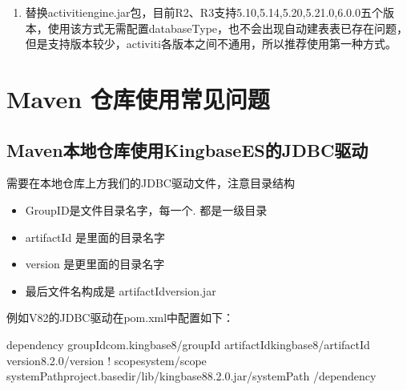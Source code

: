 \documentclass[letterpaper,10pt,english]{sphinxmanual}
\begin{document}
\begin{sphinxVerbatim}[commandchars=\\\{\}]
\end{sphinxVerbatim}
\begin{enumerate}
%
\setcounter{enumi}{1}
\item {} 
替换activiti\sphinxhyphen{}engine.jar包，目前R2、R3支持5.10,5.14,5.20,5.21.0,6.0.0五个版本，使用该方式无需配置databaseType，也不会出现自动建表表已存在问题，但是支持版本较少，activiti各版本之间不通用，所以推荐使用第一种方式。

\end{enumerate}


\section{Maven 仓库使用常见问题}
\label{\detokenize{interface/maven:maven}}\label{\detokenize{interface/maven::doc}}

\subsection{Maven本地仓库使用KingbaseES的JDBC驱动}
\label{\detokenize{interface/maven:mavenkingbaseesjdbc}}
需要在本地仓库上方我们的JDBC驱动文件，注意目录结构
\begin{itemize}
\item {} 
GroupID是文件目录名字，每一个. 都是一级目录

\item {} 
artifactId 是里面的目录名字

\item {} 
version 是更里面的目录名字

\item {} 
最后文件名构成是  artifactId\sphinxhyphen{}version.jar

\end{itemize}

例如V82的JDBC驱动在pom.xml中配置如下：

\begin{sphinxVerbatim}[commandchars=\\\{\}]
\PYGZlt{}dependency\PYGZgt{}
      \PYGZlt{}groupId\PYGZgt{}com.kingbase8\PYGZlt{}/groupId\PYGZgt{}
      \PYGZlt{}artifactId\PYGZgt{}kingbase8\PYGZlt{}/artifactId\PYGZgt{}
      \PYGZlt{}version\PYGZgt{}8.2.0\PYGZlt{}/version\PYGZgt{}
      \PYGZlt{}!\PYGZhy{}\PYGZhy{} scope\PYGZgt{}system\PYGZlt{}/scope\PYGZgt{}
   \PYGZlt{}systemPath\PYGZgt{}\PYGZdl{}\PYGZob{}project.basedir\PYGZcb{}/lib/kingbase8\PYGZhy{}8.2.0.jar\PYGZlt{}/systemPath\PYGZhy{}\PYGZhy{}\PYGZgt{}
   \PYGZlt{}/dependency\PYGZgt{}
\end{sphinxVerbatim}
\end{document}
